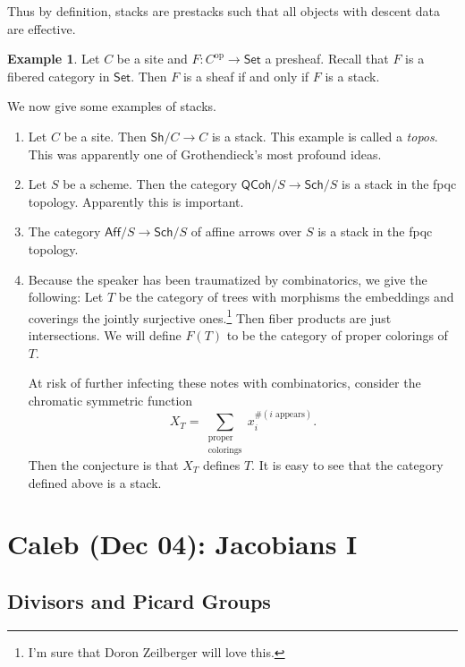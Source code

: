 \documentclass[leqno, openany]{memoir}
\theoremstyle{definition}
\newtheorem{exm}[thm]{Example}
\theoremstyle{remark}
\theoremstyle{plain}
\theoremstyle{definition}
\theoremstyle{remark}
\newcommand{\mr}[1]{\mathrm{#1}}
\newcommand{\ms}[1]{\mathsf{#1}}
\begin{document}
Thus by definition, stacks are prestacks such that all objects with descent data are effective.

\begin{exm}
    Let $C$ be a site and $F \colon C^{\mr{op}} \to \ms{Set}$ a presheaf. Recall that $F$ is a fibered category in $\ms{Set}$. Then $F$ is a sheaf if and only if $F$ is a stack.
\end{exm}

We now give some examples of stacks.

\begin{enumerate}
    \item Let $C$ be a site. Then $\ms{Sh}/C \to C$ is a stack. This example is called a \textit{topos}. This was apparently one of Grothendieck's most profound ideas.
    \item Let $S$ be a scheme. Then the category $\ms{QCoh}/S \to \ms{Sch}/S$ is a stack in the fpqc topology. Apparently this is important.
    \item The category $\ms{Aff}/S \to \ms{Sch}/S$ of affine arrows over $S$ is a stack in the fpqc topology.
    \item Because the speaker has been traumatized by combinatorics, we give the following: Let $T$ be the category of trees with morphisms the embeddings and coverings the jointly surjective ones.\footnote{I'm sure that Doron Zeilberger will love this.} Then fiber products are just intersections. We will define $F(T)$ to be the category of proper colorings of $T$.

        At risk of further infecting these notes with combinatorics, consider the chromatic symmetric function
        \[ X_T = \sum_{\substack{\text{proper} \\ \text{colorings}}} x_i^{\#(i\text{ appears})}. \]
        Then the conjecture is that $X_T$ defines $T$. It is easy to see that the category defined above is a stack.
\end{enumerate}

\chapter{Caleb (Dec 04): Jacobians I}%
\label{cha:caleb_dec_04_jacobians_i_and_shoulder_press}

\section{Divisors and Picard Groups}%
\label{sec:divisors_and_picard_groups}
\end{document}
